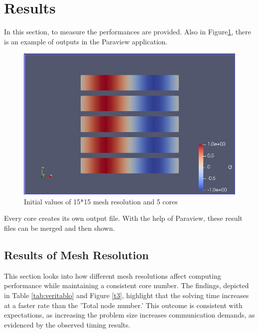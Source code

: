 \documentclass{article}
\begin{document}
\section{Results}
In this section, to measure the performances are provided. Also in Figure\ref{fig:enter-label}, there is an example of outputs in the Paraview application.  

\begin{figure}[hbt!]
    \centering
    \includegraphics[width=1\linewidth]{Figures/Initial_result.png}
    \caption{Initial values of 15*15 mesh resolution and 5 cores}
    \label{fig:enter-label}
\end{figure}
Every core creates its own output file. With the help of Paraview, these result files can be merged and then shown.  

\subsection{Results of Mesh Resolution}
This section looks into how different mesh resolutions affect computing performance while maintaining a consistent core number. The findings, depicted in Table \ref{tab:veritablo} and Figure \ref{t3}, highlight that the solving time increases at a faster rate than the 'Total node number.' This outcome is consistent with expectations, as increasing the problem size increases communication demands, as evidenced by the observed timing results.
\end{document}
